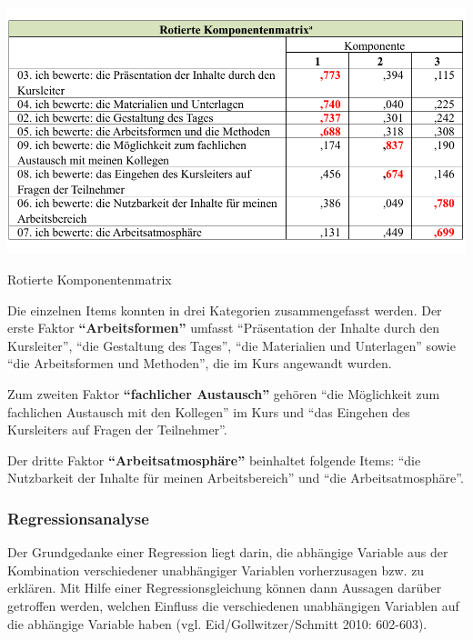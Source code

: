 \documentclass[12pt,a4paper]{article}
\begin{document}
\begin{table}[!ht]
\includegraphics[scale=0.84]{tab7.pdf}
\caption{Rotierte Komponentenmatrix}
\label{tab3}
\end{table}
\FloatBarrier

Die einzelnen Items konnten in drei Kategorien zusammengefasst werden. 	
Der erste Faktor \textbf{"`Arbeitsformen"'} umfasst "`Präsentation der Inhalte durch den Kursleiter"', "`die Gestaltung des Tages"', "`die Materialien und Unterlagen"' sowie "`die Arbeitsformen und Methoden"', die im Kurs angewandt wurden.

Zum zweiten Faktor \textbf{"`fachlicher Austausch"'} gehören "`die Möglichkeit zum fachlichen Austausch mit den Kollegen"' im Kurs und "`das Eingehen des Kursleiters auf Fragen der Teilnehmer"'.

Der dritte Faktor \textbf{"`Arbeitsatmosphäre"' }beinhaltet folgende Items: "`die Nutzbarkeit der Inhalte für meinen Arbeitsbereich"' und "`die Ar\-beits\-at\-mos\-phä\-re"'.

\subsubsection{Regressionsanalyse}

Der Grundgedanke einer Regression liegt darin, die abhängige Variable aus der Kombination verschiedener unabhängiger Variablen vorherzusagen bzw. zu erklären. Mit Hilfe einer Regressionsgleichung können dann Aussagen darüber getroffen werden, welchen Einfluss die verschiedenen unabhängigen Variablen auf die abhängige Variable haben (vgl. Eid/Gollwitzer/Schmitt 2010: 602-603). 
\end{document}
